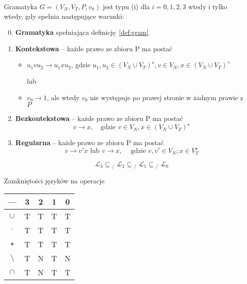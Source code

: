 \documentclass[main.tex]{subfiles}
\begin{document}
    \begin{definition}
        Gramatyka $G=(V_N,V_T,P,v_0)$ jest typu (i) dla $i=0,1,2,3$ wtedy i tylko wtedy, gdy spełnia następujące warunki:

        \begin{enumerate}
            \setcounter{enumi}{-1}
            \item \textbf{Gramatyka} spełniająca definicję~\ref{def:gram}.

            \item \textbf{Kontekstowa} -- każde prawo ze zbioru P ma postać
            \begin{itemize}[noitemsep]
                \item $u_1 v u_2 \rightarrow u_1 x u_2$, gdzie $u_1,u_2 \in (V_N \cup V_T)^\star,v \in V_N,x \in (V_N \cup V_T)^+$

                {\center lub}
                \item $v_0 \rightarrow 1$, ale wtedy $v_0$ nie występuje po prawej stronie w żadnym prawie z $P$
            \end{itemize}

            \item \textbf{Bezkontekstowa} -- każde prawo ze zbioru P ma postać
            \[v \rightarrow x, ~~~ \text{ gdzie } v \in V_N, x \in (V_N \cup V_T)^\star\]

            \item \textbf{Regularna} -- każde prawo ze zbioru P ma postać
            \[v \rightarrow v'x \text{ lub } v \rightarrow x, ~~~~ \text{ gdzie } v,v' \in V_N;x \in V_T^\star\]


            \[\mathbf{\mathcal{L}}_{3}\subseteq \! \! \! \! \! _{/\; \, }\mathbf{\mathcal{L}}_{2}\subseteq \! \! \! \! \! _{/\; \, }\mathbf{\mathcal{L}} _{1}\subseteq \! \! \! \! \! _{/\; \, }\mathbf{\mathcal{L}}_{0}\]

        \end{enumerate}

    \end{definition}

    Zamkniętości języków na operacje
    \begin{center}
        \begin{tabular}{||c c c c c||}
            \hline
            --- & 3 & 2 & 1 & 0 \\ [0.5ex]
            \hline\hline
            $\cup$ & T & T & T & T \\
            \hline
            $\cdot$ & T & T & T & T \\
            \hline
            $\star$ & T & T & T & T \\
            \hline
            $\setminus$ & T & N & T & N \\
            \hline
            $\cap $ & T & N & T & T \\ [1ex]
            \hline
        \end{tabular}
    \end{center}
\end{document}
